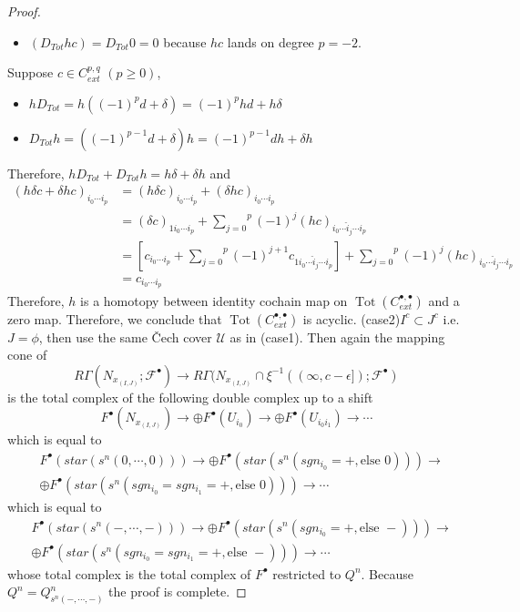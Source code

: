 \begin{proof}
\begin{itemize}
\item $(D_{Tot}hc) = D_{Tot}0=0$ because $hc$ lands on degree $p=-2$.
\end{itemize}
Suppose $c\in C_{ext}^{p,q}$ $(p\geq 0)$,
\begin{itemize}
\item $hD_{Tot} = h((-1)^p d+\delta) = (-1)^p hd + h\delta$

\item $D_{Tot}h = ((-1)^{p-1}d + \delta)h = (-1)^{p-1}dh + \delta h$
\end{itemize}
Therefore, $hD_{Tot}+D_{Tot}h = h\delta + \delta h$ and 
\begin{align*}
(h\delta c + \delta hc)_{i_0 \cdots i_p} &= (h\delta c)_{i_0 \cdots i_p} + (\delta hc)_{i_0 \cdots i_p}\\
&= (\delta c)_{1i_0 \cdots i_p} + \overset{p}{\underset{j=0}{\sum}}
(-1)^j (hc)_{i_0 \cdots \hat{i}_j \cdots i_p}\\
&= [ c_{i_0 \cdots i_p} + \overset{p}{\underset{j=0}{\sum}}
(-1)^{j+1} c_{1i_0 \cdots \hat{i}_j \cdots i_p}] +  \overset{p}{\underset{j=0}{\sum}}
(-1)^j (hc)_{i_0 \cdots \hat{i}_j \cdots i_p}\\
&= c_{i_0 \cdots i_p}
\end{align*}
Therefore, $h$ is a homotopy between identity cochain map on $\operatorname{Tot}(C_{ext}^{\bullet,\bullet})$ and a zero map. Therefore, we conclude that $\operatorname{Tot}(C_{ext}^{\bullet,\bullet})$ is acyclic.
(case2)$I^c \subset J^c$ i.e. $J=\phi$, then use the same \v{C}ech cover $\mathcal{U}$ as in (case1). Then again the mapping cone of
\[R\Gamma(N_{x_{(I,J)}};\mathscr{F}^\bullet) \rightarrow R\Gamma(N_{x_{(I,J)}} \cap \xi^{-1}((\infty,c-\epsilon]);\mathscr{F}^\bullet)
\]
is the total complex of the following double complex up to a shift
\[
F^\bullet (N_{x_{(I,J)}})\rightarrow \oplus F^\bullet(U_{i_0}) \rightarrow \oplus F^\bullet(U_{i_0 i_1}) \rightarrow \cdots
\]
which is equal to 
\begin{align*}
&F^\bullet (star(s^n(0,\cdots,0)))\rightarrow \oplus F^\bullet(star(s^n(sgn_{i_0} = +,\text{else }0))) \rightarrow \\
&\oplus F^\bullet(star(s^n(sgn_{i_0}=sgn_{i_1} = +,\text{else }0))) \rightarrow \cdots
\end{align*}
which is equal to 
\begin{align*}
&F^\bullet (star(s^n(-,\cdots,-)))\rightarrow\oplus F^\bullet(star(s^n(sgn_{i_0} = +,\text{else }-))) \rightarrow \\
&\oplus F^\bullet(star(s^n(sgn_{i_0}=sgn_{i_1} = +,\text{else }-))) \rightarrow \cdots
\end{align*}
whose total complex is the total complex of $F^\bullet$ restricted to $Q^n$. Because $Q^n = Q^n_{s^n(-,\cdots,-)}$ the proof is complete.
\end{proof}
